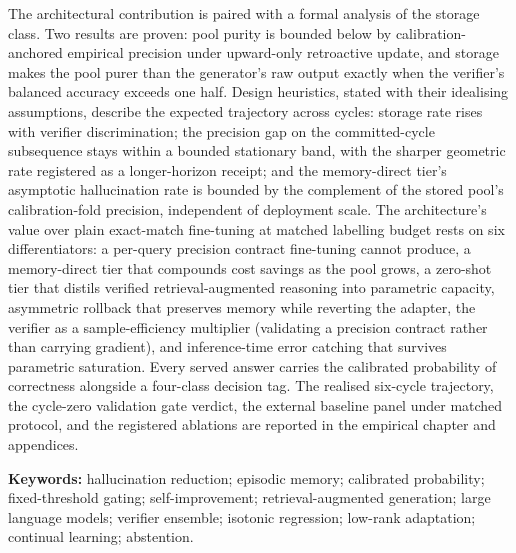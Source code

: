 The architectural contribution is paired with a formal analysis of the storage class. Two results are proven: pool purity is bounded below by calibration-anchored empirical precision under upward-only retroactive update, and storage makes the pool purer than the generator's raw output exactly when the verifier's balanced accuracy exceeds one half. Design heuristics, stated with their idealising assumptions, describe the expected trajectory across cycles: storage rate rises with verifier discrimination; the precision gap on the committed-cycle subsequence stays within a bounded stationary band, with the sharper geometric rate registered as a longer-horizon receipt; and the memory-direct tier's asymptotic hallucination rate is bounded by the complement of the stored pool's calibration-fold precision, independent of deployment scale. The architecture's value over plain exact-match fine-tuning at matched labelling budget rests on six differentiators: a per-query precision contract fine-tuning cannot produce, a memory-direct tier that compounds cost savings as the pool grows, a zero-shot tier that distils verified retrieval-augmented reasoning into parametric capacity, asymmetric rollback that preserves memory while reverting the adapter, the verifier as a sample-efficiency multiplier (validating a precision contract rather than carrying gradient), and inference-time error catching that survives parametric saturation. Every served answer carries the calibrated probability of correctness alongside a four-class decision tag. The realised six-cycle trajectory, the cycle-zero validation gate verdict, the external baseline panel under matched protocol, and the registered ablations are reported in the empirical chapter and appendices.

\vspace{0.5cm}
\noindent\textbf{Keywords:} hallucination reduction; episodic memory; calibrated probability; fixed-threshold gating; self-improvement; retrieval-augmented generation; large language models; verifier ensemble; isotonic regression; low-rank adaptation; continual learning; abstention.
